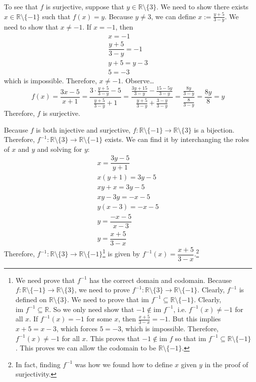 \documentclass[11pt,letterpaper]{article}
\begin{document}
To see that $f$ is surjective, suppose that $y \in \mathbb{R} \setminus \{ 3 \}$. We need to show there exists $x \in \mathbb{R} \setminus \{ -1 \}$ such that $f(x)= y$. Because $y \neq 3$, we can define $x:= \frac{y + 5}{3 - y}$. We need to show that $x \neq -1$. If $x= -1$, then
	\[
	\begin{gathered}
	x= -1 \\[0.1cm]
	\dfrac{y + 5}{3 - y}= -1 \\[0.1cm]
	y + 5= y - 3 \\[0.1cm]
	5= -3
	\end{gathered}
	\]
which is impossible. Therefore, $x \neq -1$. Observe\dots
	\[
	f(x)= \dfrac{3x - 5}{x + 1}= \dfrac{3 \cdot \frac{y + 5}{3 - y} - 5}{\frac{y + 5}{3 - y} + 1}= \dfrac{\frac{3y + 15}{3 - y} - \frac{15 - 5y}{3 - y}}{\frac{y + 5}{3 - y} + \frac{3 - y}{3 - y}}= \dfrac{\frac{8y}{3 - y}}{\frac{8}{3 - y}}= \dfrac{8y}{8}= y 
	\]
Therefore, $f$ is surjective. \pspace

Because $f$ is both injective and surjective, $f: \mathbb{R} \setminus \{ -1 \} \to \mathbb{R} \setminus \{ 3 \}$ is a bijection. Therefore, $f^{-1}: \mathbb{R} \setminus \{ 3 \} \to \mathbb{R} \setminus \{ -1 \}$ exists. We can find it by interchanging the roles of $x$ and $y$ and solving for $y$:
	\[
	\begin{gathered}
	x= \dfrac{3y - 5}{y + 1} \\[0.1cm]
	x(y + 1)= 3y - 5 \\[0.1cm]
	xy + x= 3y - 5 \\[0.1cm]
	xy - 3y= -x - 5 \\[0.1cm]
	y(x - 3)= -x - 5 \\[0.1cm]
	y= \dfrac{-x - 5}{x - 3} \\[0.1cm]
	y= \dfrac{x + 5}{3 - x}
	\end{gathered}
	\]
Therefore, $f^{-1}: \mathbb{R} \setminus \{ 3 \} \to \mathbb{R} \setminus \{ -1 \}$\footnote{We need prove that $f^{-1}$ has the correct domain and codomain. Because $f: \mathbb{R} \setminus \{ -1 \} \to \mathbb{R} \setminus \{ 3 \}$, we need to prove $f^{-1} \colon \mathbb{R} \setminus \{ 3 \} \to \mathbb{R} \setminus \{ -1 \}$. Clearly, $f^{-1}$ is defined on $\mathbb{R} \setminus \{ 3 \}$. We need to prove that $\text{im } f^{-1} \subseteq \mathbb{R} \setminus \{ -1 \}$. Clearly, $\text{im } f^{-1} \subseteq \mathbb{R}$. So we only need show that $-1 \notin \text{im } f^{-1}$, i.e. $f^{-1}(x) \neq -1$ for all $x$. If $f^{-1}(x)= -1$ for some $x$, then $\frac{x + 5}{3 - x}= -1$. But this implies $x + 5= x - 3$, which forces $5= -3$, which is impossible. Therefore, $f^{-1}(x) \neq -1$ for all $x$. This proves that $-1 \notin \text{im } f$ so that $\text{im } f^{-1} \subseteq \mathbb{R} \setminus \{ -1 \}$. This proves we can allow the codomain to be $\mathbb{R} \setminus \{ -1 \}$.} is given by $f^{-1}(x)= \dfrac{x + 5}{3 - x}$.\footnote{In fact, finding $f^{-1}$ was how we found how to define $x$ given $y$ in the proof of surjectivity.} \pspace
\end{document}

